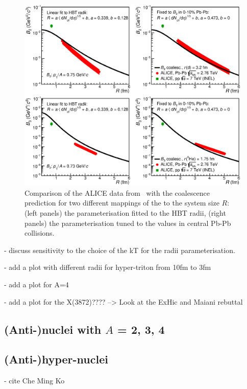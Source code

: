\documentclass[a4paper,11pt]{scrartcl} %
\begin{document}
 \begin{figure}[htbp]
\begin{center}
\includegraphics[width=\textwidth]{radiiParamCompareData.eps}
\caption{Comparison of the ALICE data from~\cite{} with the coalescence prediction for two different mappings of the \avdNdeta to the system size $R$: (left panels) the parameterisation fitted to the HBT radii, (right panels) the parameterisation tuned to the \btwo values in central Pb-Pb collisions.}
\label{fig:CompareB2B3forDifferentParamWithData}
\end{center}
\end{figure}
 
 
- discuss sensitivity to the choice of the kT for the radii parameterisation.

- add a plot with different radii for hyper-triton from 10fm to 3fm

- add a plot for A=4

- add a plot for the X(3872)???? --> Look at the ExHic and Maiani rebuttal


\subsection{(Anti-)nuclei with $A$ = 2, 3, 4}
\subsection{(Anti-)hyper-nuclei}
- cite Che Ming Ko \cite{Zhang:2018euf} 
\end{document}
